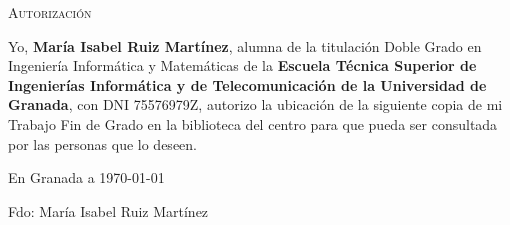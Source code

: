 \newpage
\null
\thispagestyle{empty}
\newpage
\null
\thispagestyle{empty}

\hfill\vfill


\textsc{Autorización}\\\bigskip

Yo, \textbf{María Isabel Ruiz Martínez}, alumna de la titulación Doble Grado en Ingeniería Informática y Matemáticas de la \textbf{Escuela Técnica Superior de Ingenierías Informática y de Telecomunicación de la Universidad de Granada}, con DNI 75576979Z, autorizo la ubicación de la siguiente copia de mi Trabajo Fin de Grado en la biblioteca del centro para que pueda ser consultada por las personas que lo deseen.

\medskip

En Granada a \today
\begin{flushleft}
Fdo: María Isabel Ruiz Martínez

\end{flushleft}

\vfill

\endinput